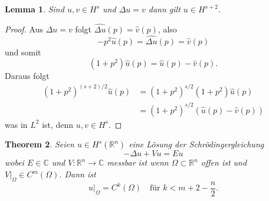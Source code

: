 \documentclass[
paper=a4,
bibtotocnumbered,
liststotocnumbered,
tablecaptionabove,
pointlessnumbers,
twoside,
openright,
10pt
]
{report}
\newtheorem{thm}{Theorem}[chapter]
\newtheorem{lem}[thm]{Lemma}
\theoremstyle{definition}
\numberwithin{equation}{chapter}
\begin{document}
\begin{lem}\label{thm6.8}
Sind $u,v\in H^s$ und $\Delta u=v$ dann gilt $u\in H^{s+2}$.
\end{lem}
\begin{proof}
Aus $\Delta u=v$ folgt $\widehat{\Delta u} (p) = \hat v(p)$, also
\begin{equation}
-p^2 \hat u(p) = \widehat{\Delta u} (p) = \hat v(p)
\end{equation}
und somit
\begin{equation}
(1+p^2) \hat u(p) = \hat u(p) - \hat v(p).
\end{equation}
Daraus folgt
\begin{align}
(1+p^2)^{(s+2)/2} \hat u(p) &= (1+p^2)^{s/2} (1+p^2) \hat u(p) \\
&= (1+p^2)^{s/2} (\hat u(p) -  \hat v(p))
\end{align}
was in $L^2$ ist, denn $u,v\in H^s$.
\end{proof}
\begin{thm}\label{4.9}
Seien $u\in H^s(\mathbb R^n)$ eine Lösung der Schrödingergleichung
\begin{equation}
-\Delta u + Vu = Eu
\end{equation}
wobei $E\in \mathbb C$ und $V: \mathbb R^n\to \mathbb C$ messbar ist wenn $\Omega \subset \mathbb R^n$ offen ist und $V\big|_\Omega \in C^m(\Omega)$. Dann ist
\begin{equation}
u\big|_\Omega = C^k(\Omega) \quad \text{für } k<m+2-\frac{n}{2}.
\end{equation}
\end{thm}
\end{document}

